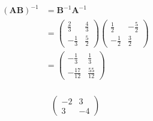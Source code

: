 \documentclass{article}
\begin{document}
\setcounter{subsubsection}{26}
\subsubsection{}

\begin{align*}
  (\mathbf{A} \mathbf{B})^{-1} & = \mathbf{B}^{-1} \mathbf{A}^{-1}           \\
                               & = \begin{pmatrix}
                                     \frac{2}{3}  & \frac{4}{3} \\
                                     -\frac{1}{3} & \frac{5}{2}
                                   \end{pmatrix} \begin{pmatrix}
                                                   \frac{1}{2}  & -\frac{5}{2} \\
                                                   -\frac{1}{2} & \frac{3}{2}
                                                 \end{pmatrix} \\
                               & = \begin{pmatrix}
                                     -\frac{1}{3}   & \frac{1}{3}   \\
                                     -\frac{17}{12} & \frac{55}{12}
                                   \end{pmatrix}
\end{align*}

\setcounter{subsubsection}{28}
\subsubsection{}

\[\begin{pmatrix}
    -2 & 3  \\
    3  & -4
  \end{pmatrix}\]

\setcounter{subsubsection}{30}
\subsubsection{}
\end{document}
